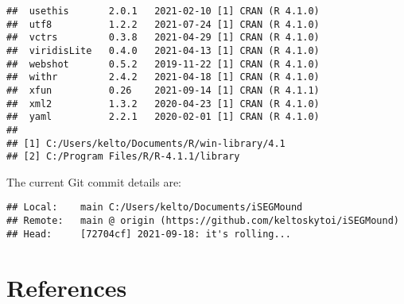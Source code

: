 \documentclass[
  12pt,
]{article}
\begin{document}
\begin{verbatim}
##  usethis       2.0.1   2021-02-10 [1] CRAN (R 4.1.0)                   
##  utf8          1.2.2   2021-07-24 [1] CRAN (R 4.1.0)                   
##  vctrs         0.3.8   2021-04-29 [1] CRAN (R 4.1.0)                   
##  viridisLite   0.4.0   2021-04-13 [1] CRAN (R 4.1.0)                   
##  webshot       0.5.2   2019-11-22 [1] CRAN (R 4.1.0)                   
##  withr         2.4.2   2021-04-18 [1] CRAN (R 4.1.0)                   
##  xfun          0.26    2021-09-14 [1] CRAN (R 4.1.1)                   
##  xml2          1.3.2   2020-04-23 [1] CRAN (R 4.1.0)                   
##  yaml          2.2.1   2020-02-01 [1] CRAN (R 4.1.0)                   
## 
## [1] C:/Users/kelto/Documents/R/win-library/4.1
## [2] C:/Program Files/R/R-4.1.1/library
\end{verbatim}

The current Git commit details are:

\begin{verbatim}
## Local:    main C:/Users/kelto/Documents/iSEGMound
## Remote:   main @ origin (https://github.com/keltoskytoi/iSEGMound)
## Head:     [72704cf] 2021-09-18: it's rolling...
\end{verbatim}

\newpage

\hypertarget{references}{%
\section{References}\label{references}}


\end{document}
